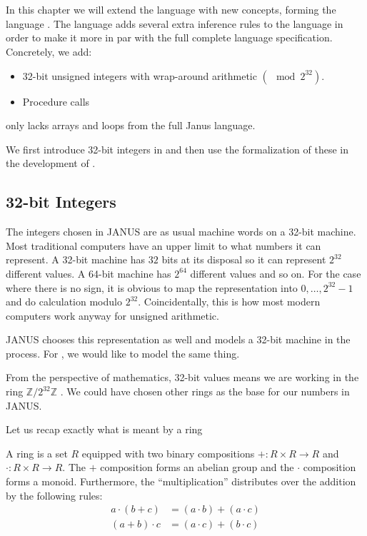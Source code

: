 \chapter{\januso{}}
\label{chap:janus1}

In this chapter we will extend the \janusz{} language with new
concepts, forming the language \januso{}. The \januso{} language adds
several extra inference rules to the \janusz{} language in order to
make it more in par with the full complete language
specification. Concretely, we add:
\begin{itemize}
\item 32-bit unsigned integers with wrap-around arithmetic $(\mod
  2^{32})$.
\item Procedure calls
\end{itemize}
\januso{} only lacks arrays and loops from the full Janus language.

We first introduce 32-bit integers in \coq{} and then use the
formalization of these in the development of \januso{}.

\section{32-bit Integers}
\label{sec:32-bit-integers}

The integers chosen in JANUS are as usual machine words on a 32-bit
machine. Most traditional computers have an upper limit to what
numbers it can represent. A 32-bit machine has $32$ bits at its
disposal so it can represent $2^{32}$ different values. A 64-bit
machine has $2^{64}$ different values and so on. For the case where
there is no sign, it is obvious to map the representation into $0,
\dotsc, 2^{32}-1$ and do calculation modulo $2^{32}$. Coincidentally,
this is how most modern computers work anyway for unsigned arithmetic.

JANUS chooses this representation as well and models a 32-bit machine
in the process. For \januso{}, we would like to model the same thing.

From the perspective of mathematics, 32-bit values means we are
working in the ring $\mathbb{Z}/2^{32}\mathbb{Z}$
\cite{jensen:klassisk}.  We could have chosen other
rings as the base for our numbers in JANUS.

Let us recap exactly what is meant by a ring
\begin{defn}
  A ring is a set $R$ equipped with two binary compositions $+\colon R
  \times R \to R$ and $\cdot \colon R \times R \to R$. The $+$
  composition forms an abelian group and the $\cdot$ composition forms
  a monoid. Furthermore, the ``multiplication'' distributes over the
  addition by the following rules:
  \begin{align*}
    a \cdot (b + c) & = (a \cdot b) + (a \cdot c)\\
    (a + b) \cdot c & = (a \cdot c) + (b \cdot c)
  \end{align*}
\end{defn}

